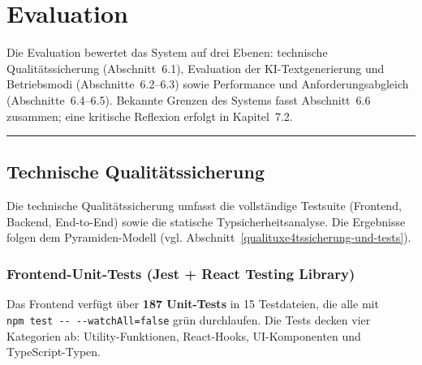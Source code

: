 \chapter{Evaluation}\label{evaluation}

Die Evaluation bewertet das System auf drei Ebenen: technische Qualitätssicherung (Abschnitt~6.1), Evaluation der KI-Textgenerierung und Betriebsmodi (Abschnitte~6.2--6.3) sowie Performance und Anforderungsabgleich (Abschnitte~6.4--6.5). Bekannte Grenzen des Systems fasst Abschnitt~6.6 zusammen; eine kritische Reflexion erfolgt in Kapitel~7.2.

\begin{center}\rule{0.5\linewidth}{0.5pt}\end{center}

\section{Technische
Qualitätssicherung}\label{technische-qualituxe4tssicherung}

Die technische Qualitätssicherung umfasst die vollständige Testsuite (Frontend, Backend, End-to-End) sowie die statische Typsicherheitsanalyse. Die Ergebnisse folgen dem Pyramiden-Modell (vgl. Abschnitt~\ref{qualituxe4tssicherung-und-tests}).

\subsection{Frontend-Unit-Tests (Jest + React Testing
Library)}\label{frontend-unit-tests-jest-react-testing-library}

Das Frontend verfügt über \textbf{187 Unit-Tests} in 15 Testdateien, die
alle mit \texttt{npm\ test\ -\/-\ -\/-watchAll=false} grün durchlaufen.
Die Tests decken vier Kategorien ab: Utility-Funktionen, React-Hooks,
UI-Komponenten und TypeScript-Typen.

